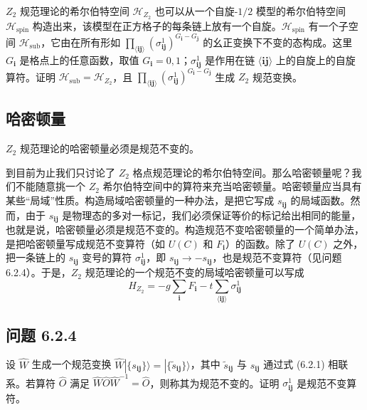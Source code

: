 $Z_2$ 规范理论的希尔伯特空间 $\mathcal{H}_{Z_2}$ 也可以从一个自旋-$1/2$ 模型的希尔伯特空间 $\mathcal{H}_{\text{spin}}$ 构造出来，该模型在正方格子的每条链上放有一个自旋。$\mathcal{H}_{\text{spin}}$ 有一个子空间 $\mathcal{H}_{\text{sub}}$，它由在所有形如 $\prod_{\langle\pmb{ij}\rangle} (\sigma^1_{\pmb{ij}})^{G_{\pmb{i}} - G_{\pmb{j}}}$ 的幺正变换下不变的态构成。这里 $G_{\pmb{i}}$ 是格点上的任意函数，取值 $G_{\pmb{i}} = 0, 1$；$\sigma^1_{\pmb{ij}}$ 是作用在链 $\langle \pmb{ij} \rangle$ 上的自旋上的自旋算符。证明 $\mathcal{H}_{\text{sub}} = \mathcal{H}_{Z_2}$，且 $\prod_{\langle\pmb{ij}\rangle} (\sigma^1_{\pmb{ij}})^{G_{\pmb{i}} - G_{\pmb{j}}}$ 生成 $Z_2$ 规范变换。

\subsection{哈密顿量}

\begin{keypoints}
\item $Z_2$ 规范理论的哈密顿量必须是规范不变的。
\end{keypoints}

到目前为止我们只讨论了 $Z_2$ 格点规范理论的希尔伯特空间。那么哈密顿量呢？我们不能随意挑一个 $Z_2$ 希尔伯特空间中的算符来充当哈密顿量。哈密顿量应当具有某些“局域”性质。构造局域哈密顿量的一种办法，是把它写成 $s_{\pmb{ij}}$ 的局域函数。然而，由于 $s_{\pmb{ij}}$ 是物理态的多对一标记，我们必须保证等价的标记给出相同的能量，也就是说，哈密顿量必须是规范不变的。构造规范不变哈密顿量的一个简单办法，是把哈密顿量写成规范不变算符（如 $U(C)$ 和 $F_{\pmb{i}}$）的函数。除了 $U(C)$ 之外，把一条链上的 $s_{\pmb{ij}}$ 变号的算符 $\sigma^1_{\pmb{ij}}$，即 $s_{\pmb{ij}} \to -s_{\pmb{ij}}$，也是规范不变算符（见问题 6.2.4）。于是，$Z_2$ 规范理论的一个规范不变的局域哈密顿量可以写成
\begin{equation*}
H_{Z_2} = -g \sum_{\pmb{i}} F_{\pmb{i}} - t \sum_{\langle \pmb{ij} \rangle} \sigma^1_{\pmb{ij}}\tag{6.2.4}
\end{equation*}

\subsection*{问题 6.2.4}

设 $\hat{W}$ 生成一个规范变换 $\hat{W}|\{s_{\pmb{ij}}\}\rangle = |\{\tilde{s}_{\pmb{ij}}\}\rangle$，其中 $\tilde{s}_{\pmb{ij}}$ 与 $s_{\pmb{ij}}$ 通过式 (6.2.1) 相联系。若算符 $\hat{O}$ 满足 $\hat{W}\hat{O}\hat{W}^{-1} = \hat{O}$，则称其为规范不变的。证明 $\sigma^1_{\pmb{ij}}$ 是规范不变算符。

